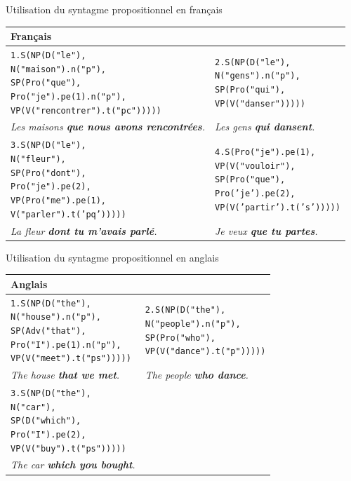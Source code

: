 \documentclass[11pt]{article} %
\newcommand{\real}[1]{\emph{#1}}
\begin{document}
\begin{example}
\caption{Utilisation du syntagme propositionnel en français}
\begin{tabular}{p{8cm} | p{6.2cm}}
\hline 
\textbf{Français} \\
\hline
\begin{alltt}
1.S(NP(D("le"),
       N("maison").n("p"),
       SP(Pro("que"),
          Pro("je").pe(1).n("p"),
          VP(V("rencontrer").t("pc")))))
\end{alltt} &
\begin{alltt}
2.S(NP(D("le"),
       N("gens").n("p"),
       SP(Pro("qui"),
          VP(V("danser")))))
\end{alltt} \\
\real{Les maisons \textbf{que nous avons rencontrées}.} & \real{Les gens \textbf{qui dansent}.} \\
\hline
\begin{alltt}
3.S(NP(D("le"),
       N("fleur"),
       SP(Pro("dont"),
          Pro("je").pe(2),
          VP(Pro("me").pe(1),
             V("parler").t('pq')))))
\end{alltt} &
\begin{alltt}
4.S(Pro("je").pe(1),
    VP(V("vouloir"),
       SP(Pro("que"),
          Pro('je').pe(2),
          VP(V('partir').t('s')))))
\end{alltt} \\
\real{La fleur \textbf{dont tu m'avais parlé}.} & \real{Je veux \textbf{que tu partes}.} \\
\end{tabular}
\end{example}
\begin{example}
\caption{Utilisation du syntagme propositionnel en anglais}
\begin{tabular}{p{7cm} | p{7cm}}
\hline
\textbf{Anglais} \\
\hline
\begin{alltt}
1.S(NP(D("the"),
       N("house").n("p"),
       SP(Adv("that"),
          Pro("I").pe(1).n("p"),
          VP(V("meet").t("ps")))))
\end{alltt} &
\begin{alltt}
2.S(NP(D("the"),
       N("people").n("p"),
       SP(Pro("who"),
          VP(V("dance").t("p")))))
\end{alltt} \\
\real{The house \textbf{that we met}.} & \real{The people \textbf{who dance}.} \\
\hline
\begin{alltt}
3.S(NP(D("the"),
       N("car"),
       SP(D("which"),
          Pro("I").pe(2),
          VP(V("buy").t("ps")))))
\end{alltt} \\
\real{The car \textbf{which you bought}.}
\end{tabular}
\label{propEx}
\end{example}
\end{document}
